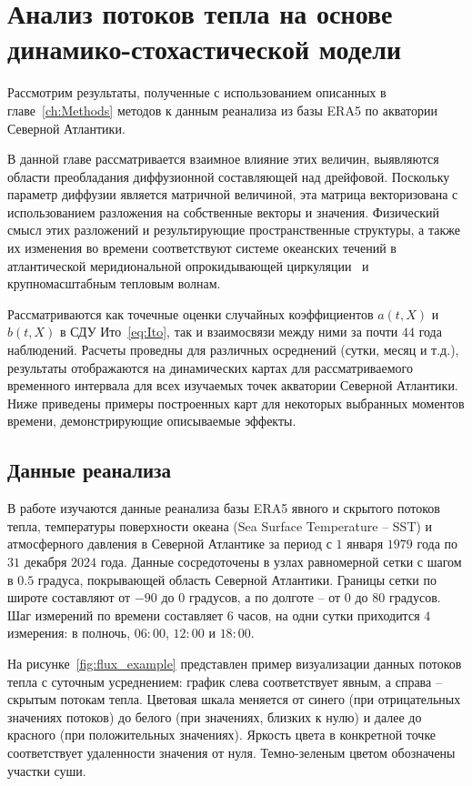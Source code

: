 \chapter{Анализ потоков тепла на основе динамико-стохастической модели}
\label{chc:Analysis}
Рассмотрим результаты, полученные с использованием описанных в главе~\ref{ch:Methods} методов к данным реанализа из базы ERA5 по акватории Северной Атлантики. 


В данной главе рассматривается взаимное влияние этих величин, выявляются области преобладания диффузионной составляющей над дрейфовой. Поскольку параметр диффузии является матричной величиной, эта матрица векторизована с использованием разложения на собственные векторы и значения. Физический смысл этих разложений и результирующие пространственные структуры, а также их изменения во времени соответствуют системе океанских течений в атлантической меридиональной опрокидывающей циркуляции~\cite{Caesar2018} и крупномасштабным тепловым волнам.

Рассматриваются как точечные оценки случайных коэффициентов $a(t,X)$ и $b(t, X)$ в СДУ Ито~\eqref{eq:Ito}, так и взаимосвязи между ними за почти $44$ года наблюдений. Расчеты проведны для различных осреднений (сутки, месяц и т.д.), результаты отображаются на динамических картах для рассматриваемого временного интервала для всех изучаемых точек акватории Северной Атлантики. Ниже приведены примеры построенных карт для некоторых выбранных моментов времени, демонстрирующие описываемые эффекты.


\section{Данные реанализа}
В работе изучаются данные реанализа базы ERA5 явного и скрытого потоков тепла, температуры поверхности океана (Sea Surface Temperature -- SST) и атмосферного давления в Северной Атлантике за период с $1$ января $1979$ года по $31$ декабря $2024$ года.
Данные сосредоточены в узлах равномерной сетки с шагом в $0.5$ градуса, покрывающей область Северной Атлантики. Границы сетки по широте составляют от $-90$ до $0$ градусов, а по долготе -- от $0$ до $80$ градусов. Шаг измерений по времени составляет $6$ часов, на одни сутки приходится $4$ измерения: в полночь, $06:00$, $12:00$ и $18:00$.

На рисунке~\ref{fig:flux_example} представлен пример визуализации данных потоков тепла с суточным усреднением: график слева соответствует явным, а справа -- скрытым потокам тепла. Цветовая шкала меняется от синего (при отрицательных значениях потоков) до белого (при значениях, близких к нулю) и далее до красного (при положительных значениях). Яркость цвета в конкретной точке соответствует удаленности значения от нуля. Темно-зеленым цветом обозначены участки суши.

